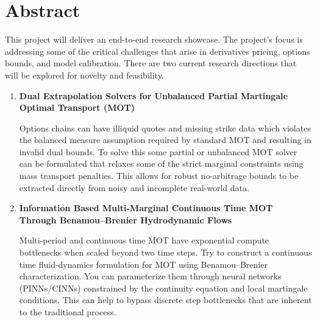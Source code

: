 \documentclass[11pt]{article}
\begin{document}
\section*{Abstract}

This project will deliver an end-to-end research showcase. The project's focus is addressing some of the critical challenges that arise in derivatives pricing, options bounds, and model calibration. There are two current research directions that will be explored for novelty and feasibility.

\begin{enumerate}
  \item \textbf{Dual Extrapolation Solvers for Unbalanced Partial Martingale Optimal Transport (MOT)}

  Options chains can have illiquid quotes and missing strike data which violates the balanced measure assumption required by standard MOT and resulting in invalid dual bounds. To solve this some partial or unbalanced MOT solver can be formulated that relaxes some of the strict marginal constraints using mass transport penalties. This allows for robust no-arbitrage bounds to be extracted directly from noisy and incomplete real-world data.

  \item \textbf{Information Based Multi-Marginal Continuous Time MOT Through Benamou--Brenier Hydrodynamic Flows}

  Multi-period and continuous time MOT have exponential compute bottlenecks when scaled beyond two time steps. Try to construct a continuous time fluid-dynamics formulation for MOT using Benamou--Brenier characterization. You can parameterize them through neural networks (PINNs/CINNs) constrained by the continuity equation and local martingale conditions. This can help to bypass discrete step bottlenecks that are inherent to the traditional process.
\end{enumerate}
\end{document}
